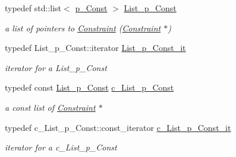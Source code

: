 \begin{DoxyCompactItemize}
typedef std\+::list$<$ \mbox{\hyperlink{group___constraint___t_y_p_e_s_gae2abae1fd3e9370e1c0cc9dfbb4d6718}{p\+\_\+\+Const}} $>$ \mbox{\hyperlink{group___constraint___t_y_p_e_s_gaa56320d40c626389a8a4ce4b5a4fb0a8}{List\+\_\+p\+\_\+\+Const}}
\begin{DoxyCompactList}\small\item\em a list of pointers to \mbox{\hyperlink{class_s_m_spp__di__unipi__it_1_1_constraint}{Constraint}} (\mbox{\hyperlink{class_s_m_spp__di__unipi__it_1_1_constraint}{Constraint}} $\ast$) \end{DoxyCompactList}\item 
\mbox{\label{group___constraint___t_y_p_e_s_gae9df1eca77351c69dda87903069d31f9}} 
typedef List\+\_\+p\+\_\+\+Const\+::iterator \mbox{\hyperlink{group___constraint___t_y_p_e_s_gae9df1eca77351c69dda87903069d31f9}{List\+\_\+p\+\_\+\+Const\+\_\+it}}
\begin{DoxyCompactList}\small\item\em iterator for a List\+\_\+p\+\_\+\+Const \end{DoxyCompactList}\item 
\mbox{\label{group___constraint___t_y_p_e_s_ga6279fed2d96abe5a21abdb8236050f07}} 
typedef const \mbox{\hyperlink{group___constraint___t_y_p_e_s_gaa56320d40c626389a8a4ce4b5a4fb0a8}{List\+\_\+p\+\_\+\+Const}} \mbox{\hyperlink{group___constraint___t_y_p_e_s_ga6279fed2d96abe5a21abdb8236050f07}{c\+\_\+\+List\+\_\+p\+\_\+\+Const}}
\begin{DoxyCompactList}\small\item\em a const list of \mbox{\hyperlink{class_s_m_spp__di__unipi__it_1_1_constraint}{Constraint}} $\ast$ \end{DoxyCompactList}\item 
\mbox{\label{group___constraint___t_y_p_e_s_ga79d1198390aff9a22574ada53e7d161a}} 
typedef c\+\_\+\+List\+\_\+p\+\_\+\+Const\+::const\+\_\+iterator \mbox{\hyperlink{group___constraint___t_y_p_e_s_ga79d1198390aff9a22574ada53e7d161a}{c\+\_\+\+List\+\_\+p\+\_\+\+Const\+\_\+it}}
\begin{DoxyCompactList}\small\item\em iterator for a c\+\_\+\+List\+\_\+p\+\_\+\+Const \end{DoxyCompactList}\item 
\mbox{\label{group___constraint___t_y_p_e_s_gaa409095a6d6a88da1046314c1752d89d}} 

\end{DoxyCompactItemize}
